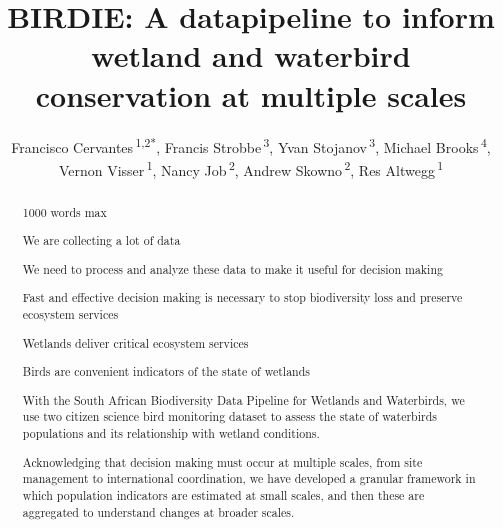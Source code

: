 \documentclass[utf8]{frontiersSCNS}
\def\Authors{
  Francisco Cervantes\,\textsuperscript{1,2*},
  Francis Strobbe\,\textsuperscript{3},
  Yvan Stojanov\,\textsuperscript{3},
  Michael Brooks\,\textsuperscript{4},
  Vernon Visser\,\textsuperscript{1},
  Nancy Job\,\textsuperscript{2},
  Andrew Skowno\,\textsuperscript{2},
  Res Altwegg\,\textsuperscript{1}}
\def\firstAuthorLast{Cervantes {et~al.}}
\begin{document}
\onecolumn
{}


\title[BIRDIE Biodiversity Datapipeline]{BIRDIE: A datapipeline to
inform wetland and waterbird conservation at multiple scales}
\author[\firstAuthorLast]{\Authors}
\address{} %
\correspondance{} %

\extraAuth{}%


\maketitle

\begin{abstract}

1000 words max

We are collecting a lot of data

We need to process and analyze these data to make it useful for decision making

Fast and effective decision making is necessary to stop biodiversity loss and preserve ecosystem services

Wetlands deliver critical ecosystem services

Birds are convenient indicators of the state of wetlands

With the South African Biodiversity Data Pipeline for Wetlands and Waterbirds, we use two citizen science
bird monitoring dataset to assess the state of waterbirds populations and its relationship with 
wetland conditions.

Acknowledging that decision making must occur at multiple scales, from site management to international
coordination, we have developed a granular framework in which population indicators are estimated
at small scales, and then these are aggregated to understand changes at broader scales.



\end{abstract}
\end{document}
